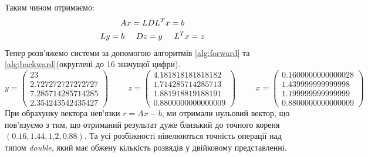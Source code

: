 Таким чином отримаємо:
\begin{gather*}
    Ax = LDL^Tx= b \\
    Ly = b \hspace{0.5cm}
    Dz = y \hspace{0.5cm}
    L^T x = z
\end{gather*}
Тепер розв'яжемо системи за допомогою
алгоритмів \ref{alg:forward} та
\ref{alg:backward}(округлені до 16 значущої цифри).
\[
    y = \begin{pmatrix}
        23 \\
        2.727272727272727 \\
        7.285714285714285 \\
        2.354243542435427
    \end{pmatrix} \hspace{1cm}
    z = \begin{pmatrix}
        4.181818181818182 \\
        1.714285714285713 \\
        1.881918819188191 \\
        0.8800000000000009
    \end{pmatrix} \hspace{1cm}
    x = \begin{pmatrix}
        0.1600000000000028 \\
        1.439999999999998 \\
        1.199999999999999 \\
        0.8800000000000009
    \end{pmatrix}
\]
При обрахунку вектора нев'язки $r = Ax - b$,
ми отримали нульовий вектор, що пов'язуємо з тим,
що отриманий результат дуже близький до
точного кореня $(0.16, 1.44, 1.2, 0.88)$. Та усі розбіжності
нівелюються точність операції над типом \textit{double},
який має обжену кількість розвядів у двійковому представленні.
